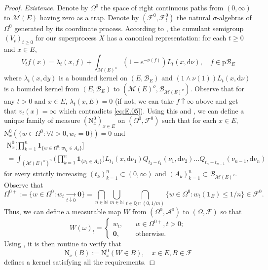 \documentclass[12pt,a4paper]{amsart}
\numberwithin{equation}{section}
\theoremstyle{plain}
\theoremstyle{definition}
\theoremstyle{remark}
\begin{document}
\begin{proof}
\emph{Existence.}
	Denote by $\Omega^0$ the space of right continuous paths from $(0,\infty)$ to $\mathcal M(E)$ having zero as a trap. 
	Denote by $(\mathscr F^0, \mathscr F_t^0)$ the natural $\sigma$-algebras of $\Omega^0$ generated by its coordinate process.
	According to \cite[Theorem 1.36]{Li2011Measure-valued}, the cumulant semigroup $(V_t)_{t\geq 0}$ for our superprocess $X$ has a canonical representation: for each $t\geq 0$ and $x\in E$, \[V_tf(x) = \lambda_t(x,f) + \int_{\mathcal M(E)^o} (1-e^{-\nu(f)}) L_t(x,\mathrm d\nu), \quad f\in \mathrm p\mathscr B_E\] where $\lambda_t(x,\mathrm dy)$ is a bounded kernel on $(E, \mathscr B_E)$ and $(1\wedge \nu(1)) L_t(x, \mathrm d\nu)$ is a bounded kernel from $(E, \mathscr B_E)$ to $(\mathcal M(E)^o, \mathscr B_{\mathcal M(E)^o})$. 
	Observe that for any $t>0$ and $x\in E$, $\lambda_t(x, E) = 0$ (if not, we can take $f \uparrow \infty$ above and get that $v_t(x) = \infty$ which contradicts \eqref{eq:E.05}).
	Using this and \cite[Section 8.4]{Li2011Measure-valued}, we can define a unique family of measure $(\mathrm N^0_x)_{x\in E}$ 
	on $(\Omega^0, \mathscr F^0)$ such that for each $x\in E$, $\mathrm N^0_x(\{w\in \Omega^0:\forall t>0, w_t=\mathbf 0\}) = 0$ and
\[
\begin{multlined}
	\mathrm N^0_x\Big[\prod_{k=1}^n\mathbf 1_{\{w\in \Omega^0: w_{t_k}\in A_k\}} \Big]
	\\=\int_{(\mathcal M(E)^o)^n} \Big(\prod_{k=1}^n \mathbf 1_{\{\nu_{k}\in A_k\}}\Big)L_{t_1}(x,\mathrm d\nu_1) Q_{t_2-t_1}(\nu_1,\mathrm d\nu_2) \dots Q_{t_n-t_{n-1}}(\nu_{n-1},\mathrm d\nu_n)
\end{multlined}
\]
	for every strictly increasing $(t_k)_{k=1}^n \subset (0,\infty)$ and $(A_k)_{k=1}^n \subset \mathscr B_{\mathcal M(E)^o}$.
	Observe that 
\[
	\Omega^{0+}:=\{w\in \Omega^0: w_t \xrightarrow[t\downarrow 0 ]{} \mathbf 0\}
	= \bigcap_{n\in \mathbb N} \bigcup_{m\in \mathbb N} \bigcap_{t\in \mathbb Q \cap (0, 1/m)} \{w\in \Omega^0:w_t(\mathbf 1_E) \leq 1/n\}\in \mathscr F^0.
\]
	Thus, we can define a measurable map $W$ from $(\Omega^0, \mathscr A^0)$ to $(\Omega, \mathscr F)$ so that
\[
	W(\omega)_t = \begin{cases}
		w_t, &\quad w\in \Omega^{0+}, t>0;
		\\ \mathbf 0, &\quad \text{otherwise}.
	\end{cases}
\]
	Using \cite[Theorems 8.22 and 8.24]{Li2011Measure-valued}, it is then routine to verify that
\[
	\mathrm N_x(B) := \mathrm N_x^0(W\in B), \quad x\in E,B\in \mathscr F
\]
	defines a kernel satisfying all the requirements.


\end{proof}
\end{document}
